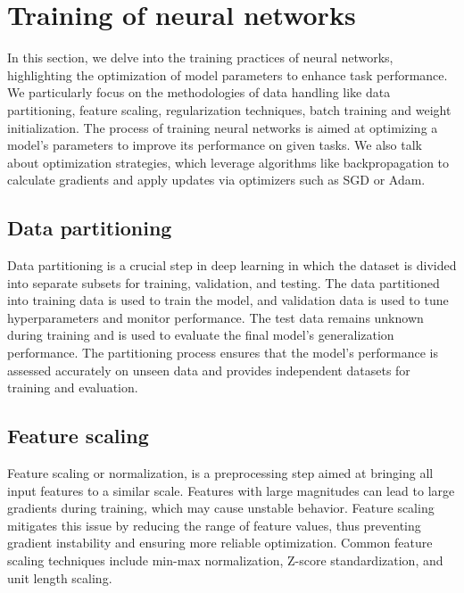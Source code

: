 \section{Training of neural networks}\label{optrain}
In this section, we delve into the training practices of neural networks, highlighting the optimization of model parameters to enhance task performance. We particularly focus on the methodologies of data handling like data partitioning, feature scaling, regularization techniques, batch training and weight initialization.
The process of training neural networks is aimed at optimizing a model's parameters to improve its performance on given tasks. We also talk about optimization strategies, which leverage algorithms like backpropagation to calculate gradients and apply updates via optimizers such as SGD or Adam.
\subsection{Data partitioning}Data partitioning is a crucial step in deep learning in which the dataset is divided into separate subsets for training, validation, and testing. The data partitioned into training data is used to train the model, and validation data is used to tune hyperparameters and monitor performance. The test data remains unknown during training and is used to evaluate the final model's generalization performance. The partitioning process ensures that the model's performance is assessed accurately on unseen data and provides independent datasets for training and evaluation. 
\subsection{Feature scaling}Feature scaling or normalization, is a preprocessing step aimed at bringing all input features to a similar scale. Features with large magnitudes can lead to large gradients during training, which may cause unstable behavior. Feature scaling mitigates this issue by reducing the range of feature values, thus preventing gradient instability and ensuring more reliable optimization. Common feature scaling techniques include min-max normalization, Z-score standardization, and unit length scaling.
